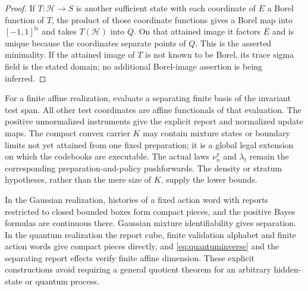 \begin{proof}
If $T:\mathcal H\to S$ is another sufficient state with each coordinate of $E$ a Borel function of $T$, the product of those coordinate functions gives a Borel map into $[-1,1]^{\mathbb N}$ and takes $T(\mathcal H)$ into $Q$. On that attained image it factors $E$ and is unique because the coordinates separate points of $Q$. This is the asserted minimality. If the attained image of $T$ is not known to be Borel, its trace sigma field is the stated domain; no additional Borel-image assertion is being inferred.
\end{proof}

For a finite affine realization, evaluate a separating finite basis of the invariant test span. All other test coordinates are affine functionals of that evaluation. The positive unnormalized instruments give the explicit report and normalized update maps. The compact convex carrier $K$ may contain mixture states or boundary limits not yet attained from one fixed preparation; it is a global legal extension on which the codebooks are executable. The actual laws $\nu_n^\pi$ and $\lambda_t$ remain the corresponding preparation-and-policy pushforwards. The density or stratum hypotheses, rather than the mere size of $K$, supply the lower bounds.

In the Gaussian realization, histories of a fixed action word with reports restricted to closed bounded boxes form compact pieces, and the positive Bayes formulas are continuous there. Gaussian mixture identifiability gives separation. In the quantum realization the report cube, finite validation alphabet and finite action words give compact pieces directly, and \eqref{eq:quantuminverse} and the separating report effects verify finite affine dimension. These explicit constructions avoid requiring a general quotient theorem for an arbitrary hidden-state or quantum process.
